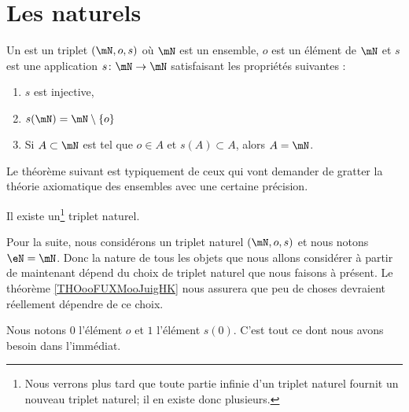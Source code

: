 \section{Les naturels}
\label{SECooPJSYooNYaIaq}

\begin{definition}     \label{DEFooBJBOooWlblAx}
    Un  est un triplet \( (\mN, o, s)\) où \( \mN\) est un ensemble, \( o\) est un élément de \( \mN\) et \( s\) est une application \( s\colon \mN\to \mN\) satisfaisant les propriétés suivantes :
    \begin{enumerate}
        \item
            \( s\) est injective,
        \item       \label{ITEMooQAKJooGKdJsM}
            \( s(\mN)=\mN\setminus \{ o \} \)
        \item       \label{ITEMooXPYEooFajywh}
            Si \( A\subset \mN\) est tel que \( o\in A\) et \( s(A)\subset A\), alors \( A=\mN\).
    \end{enumerate}
\end{definition}

Le théorème suivant est typiquement de ceux qui vont demander de gratter la théorie axiomatique des ensembles avec une certaine précision.
\begin{theorem}     \label{THOooOXMHooXYgMqb}
    Il existe un\footnote{Nous verrons plus tard que toute partie infinie d'un triplet naturel fournit un nouveau triplet naturel; il en existe donc plusieurs.} triplet naturel.
\end{theorem}

\begin{normaltext}[Définition de \( \eN\)]
    Pour la suite, nous considérons un triplet naturel \( (\mN,o,s)\) et nous notons \( \eN=\mN\). Donc la nature de tous les objets que nous allons considérer à partir de maintenant dépend du choix de triplet naturel que nous faisons à présent. Le théorème \ref{THOooFUXMooJuigHK} nous assurera que peu de choses devraient réellement dépendre de ce choix.

    Nous notons \( 0\) l'élément \( o\) et \( 1\) l'élément \( s(0)\). C'est tout ce dont nous avons besoin dans l'immédiat.
\end{normaltext}

